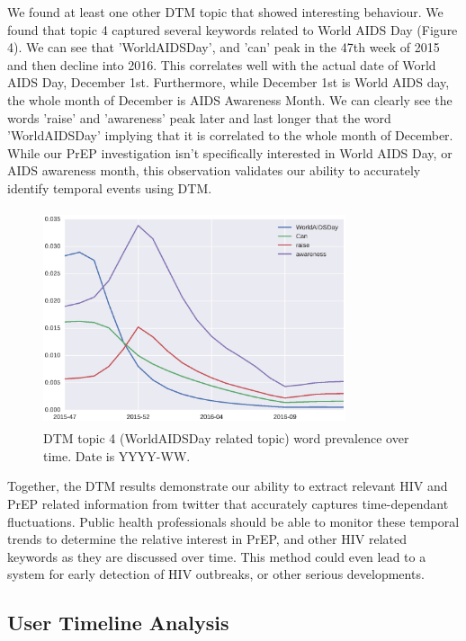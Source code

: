 \documentclass{sig-alternate-05-2015}
\begin{document}
We found at least one other DTM topic that showed interesting behaviour. We found that topic 4 captured several keywords related to World AIDS Day (Figure 4). We can see that 'WorldAIDSDay', and 'can' peak in the 47th week of 2015 and then decline into 2016. This correlates well with the actual date of World AIDS Day, December 1st. Furthermore, while December 1st is World AIDS day, the whole month of December is AIDS Awareness Month. We can clearly see the words 'raise' and 'awareness' peak later and last longer that the word 'WorldAIDSDay' implying that it is correlated to the whole month of December. While our PrEP investigation isn't specifically interested in World AIDS Day, or AIDS awareness month, this observation validates our ability to accurately identify temporal events using DTM. 

\begin{figure}
\centering
\includegraphics[height=2.5in, width=3.5in]{DTMfig2}
\caption{DTM topic 4 (WorldAIDSDay related topic) word prevalence over time. Date is YYYY-WW.}
\end{figure}

Together, the DTM results demonstrate our ability to extract relevant HIV and PrEP related information from twitter that accurately captures time-dependant fluctuations. Public health professionals should be able to monitor these temporal trends to determine the relative interest in PrEP, and other HIV related keywords as they are discussed over time. This method could even lead to a system for early detection of HIV outbreaks, or other serious developments.

\subsection{User Timeline Analysis}

\end{document}
